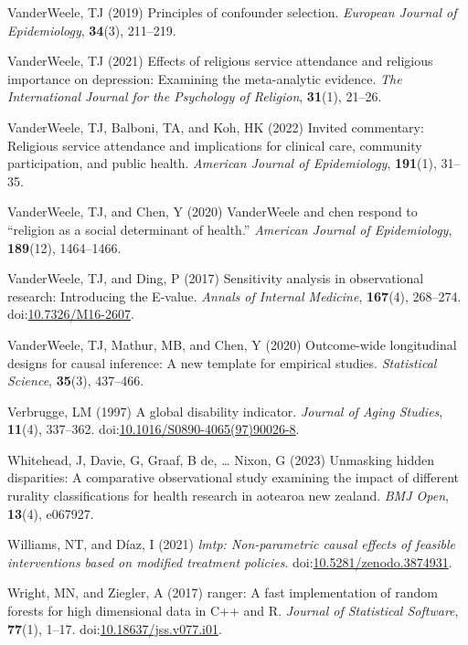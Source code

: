 \documentclass[
  single column]{article}
\newlength{\cslhangindent}
\newenvironment{CSLReferences}[2] %
 {\begin{list}{}{%
  \setlength{\itemindent}{0pt}
  \setlength{\leftmargin}{0pt}
  \setlength{\parsep}{0pt}
  \ifodd #1
   \setlength{\leftmargin}{\cslhangindent}
   \setlength{\itemindent}{-1\cslhangindent}
  \fi
  \setlength{\itemsep}{#2\baselineskip}}}
 {\end{list}}
\begin{document}
\begin{CSLReferences}{1}{0}
VanderWeele, TJ (2019) Principles of confounder selection.
\emph{European Journal of Epidemiology}, \textbf{34}(3), 211--219.

VanderWeele, TJ (2021) Effects of religious service attendance and
religious importance on depression: Examining the meta-analytic
evidence. \emph{The International Journal for the Psychology of
Religion}, \textbf{31}(1), 21--26.

VanderWeele, TJ, Balboni, TA, and Koh, HK (2022) Invited commentary:
Religious service attendance and implications for clinical care,
community participation, and public health. \emph{American Journal of
Epidemiology}, \textbf{191}(1), 31--35.

VanderWeele, TJ, and Chen, Y (2020) VanderWeele and chen respond to
{``religion as a social determinant of health.''} \emph{American Journal
of Epidemiology}, \textbf{189}(12), 1464--1466.

VanderWeele, TJ, and Ding, P (2017) Sensitivity analysis in
observational research: Introducing the {E}-value. \emph{Annals of
Internal Medicine}, \textbf{167}(4), 268--274.
doi:\href{https://doi.org/10.7326/M16-2607}{10.7326/M16-2607}.

VanderWeele, TJ, Mathur, MB, and Chen, Y (2020) Outcome-wide
longitudinal designs for causal inference: A new template for empirical
studies. \emph{Statistical Science}, \textbf{35}(3), 437--466.

Verbrugge, LM (1997) A global disability indicator. \emph{Journal of
Aging Studies}, \textbf{11}(4), 337--362.
doi:\href{https://doi.org/10.1016/S0890-4065(97)90026-8}{10.1016/S0890-4065(97)90026-8}.

Whitehead, J, Davie, G, Graaf, B de, \ldots{} Nixon, G (2023) Unmasking
hidden disparities: A comparative observational study examining the
impact of different rurality classifications for health research in
aotearoa new zealand. \emph{BMJ Open}, \textbf{13}(4), e067927.

Williams, NT, and Díaz, I (2021) \emph{{l}mtp: Non-parametric causal
effects of feasible interventions based on modified treatment policies}.
doi:\href{https://doi.org/10.5281/zenodo.3874931}{10.5281/zenodo.3874931}.

Wright, MN, and Ziegler, A (2017) {ranger}: A fast implementation of
random forests for high dimensional data in {C++} and {R}. \emph{Journal
of Statistical Software}, \textbf{77}(1), 1--17.
doi:\href{https://doi.org/10.18637/jss.v077.i01}{10.18637/jss.v077.i01}.

\end{CSLReferences}
\end{document}
